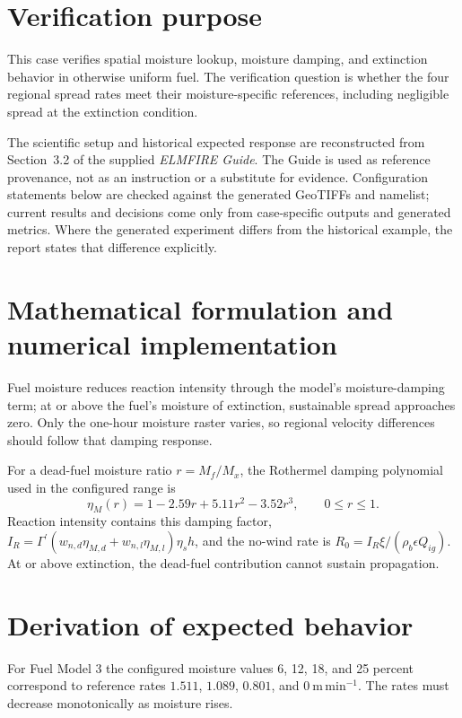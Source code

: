 \section{Verification purpose}

This case verifies spatial moisture lookup, moisture damping, and extinction behavior in otherwise uniform fuel.  The verification question is whether the four regional spread rates meet their moisture-specific references, including negligible spread at the extinction condition.

The scientific setup and historical expected response are reconstructed from Section~3.2 of the supplied \emph{ELMFIRE Guide}. The Guide is used as reference provenance, not as an instruction or a substitute for evidence. Configuration statements below are checked against the generated GeoTIFFs and namelist; current results and decisions come only from case-specific outputs and generated metrics. Where the generated experiment differs from the historical example, the report states that difference explicitly.

\section{Mathematical formulation and numerical implementation}

Fuel moisture reduces reaction intensity through the model's moisture-damping term; at or above the fuel's moisture of extinction, sustainable spread approaches zero.  Only the one-hour moisture raster varies, so regional velocity differences should follow that damping response.

For a dead-fuel moisture ratio \(r=M_f/M_x\), the Rothermel damping polynomial used in the configured range is
\begin{equation}
\eta_M(r)=1-2.59r+5.11r^2-3.52r^3, \qquad 0\le r\le1.
\end{equation}
Reaction intensity contains this damping factor, \(I_R=\Gamma^{\prime}(w_{n,d}\eta_{M,d}+w_{n,l}\eta_{M,l})\eta_s h\), and the no-wind rate is \(R_0=I_R\xi/(\rho_b\epsilon Q_{ig})\). At or above extinction, the dead-fuel contribution cannot sustain propagation.

\section{Derivation of expected behavior}

For Fuel Model 3 the configured moisture values 6, 12, 18, and 25 percent correspond to reference rates \(1.511\), \(1.089\), \(0.801\), and \(0~\mathrm{m\,min^{-1}}\).  The rates must decrease monotonically as moisture rises.

